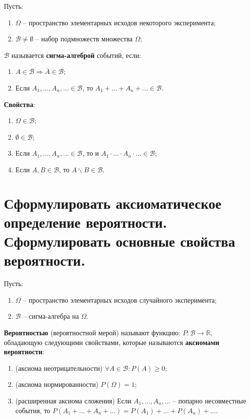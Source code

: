 Пусть:
\begin{enumerate}
	\item $\Omega$ -- пространство элементарных исходов некоторого эксперимента;
	\item $\mathcal{B} \neq \emptyset$ -- набор подмножеств множества $\Omega$;
\end{enumerate}

$\mathcal{B}$ называется \textbf{сигма-алгеброй} событий, если:
\begin{enumerate}
	\item $A \in \mathcal{B} \Rightarrow \overline{A} \in \mathcal{B}$;
	\item Если $A_1, ..., A_n, ... \in \mathcal{B}$, то $A_1 + ... + A_n + ... \in \mathcal{B}$.
\end{enumerate}

\textbf{Свойства}:
\begin{enumerate}
	\item $\Omega \in \mathcal{B}$;
	\item $\emptyset \in \mathcal{B}$;
	\item Если $A_1, ..., A_n, ... \in \mathcal{B}$, то и $A_1 \cdot ... \cdot A_n \cdot ... \in \mathcal{B}$;
	\item Если $A, B \in \mathcal{B}$, то $A \backslash B \in \mathcal{B}$.
\end{enumerate}

\section{Сформулировать аксиоматическое определение вероятности. Сформулировать основные свойства вероятности.}

Пусть:
\begin{enumerate}
	\item $\Omega$ -- пространство элементарных исходов случайного эксперимента;
	\item $\mathcal{B}$ -- сигма-алгебра на $\Omega$.
\end{enumerate}

\textbf{Вероятностью} (вероятностной мерой) называют функцию: $P: \mathcal{B} \rightarrow \mathbb{R}$, обладающую следующими свойствами, которые называются \textbf{аксиомами вероятности}:
\begin{enumerate}
	\item (аксиома неотрицательности) $\forall A \in \mathcal{B}: P(A) \geq 0$;
	\item (аксиома нормированности) $P(\Omega) = 1$;
	\item (расширенная аксиома сложения) Если $A_1, ..., A_n, ...$ -- попарно несовместные события, то $P(A_1 + ... + A_n + ...) = P(A_1) + ... + P(A_n) + ...$.
\end{enumerate}

